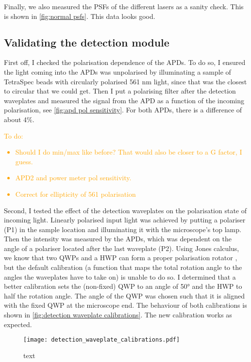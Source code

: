 Finally, we also measured the PSFs of the different lasers as a sanity check. This is shown in \autoref{fig:normal psfs}. This data looks good.  

\subsection{Validating the detection module}

First off, I checked the polarisation dependence of the APDs. To do so, I ensured the light coming into the APDs was unpolarised by illuminating a sample of TetraSpec beads with circularly polarised 561 nm light, since that was the closest to circular that we could get. Then I put a polarising filter after the detection waveplates and measured the signal from the APD as a function of the incoming polarisation, see \autoref{fig:apd pol sensitivity}. For both APDs, there is a difference of about 4\%.

\textcolor{orange}{
To do:
	\begin{itemize}
		\item Should I do min/max like before? That would also be closer to a G factor, I guess.
		\item APD2 and power meter pol sensitivity.
		\item Correct for ellipticity of 561 polarisation
	\end{itemize}
} 

Second, I tested the effect of the detection waveplates on the polarisation state of incoming light. Linearly polarised input light was achieved by putting a polariser (P1) in the sample location and illuminating it with the microscope's top lamp. Then the intensity was measured by the APDs, which was dependent on the angle of a polariser located after the last waveplate (P2). Using Jones calculus, we know that two QWPs and a HWP can form a proper polarisation rotator , but the default calibration (a function that maps the total rotation angle to the angles the waveplates have to take on) is unable to do so. I determined that a better calibration sets the (non-fixed) QWP to an angle of 50° and the HWP to half the rotation angle. The angle of the QWP was chosen such that it is aligned with the fixed QWP at the microscope end. The behaviour of both calibrations is shown in \autoref{fig:detection waveplate calibrations}. The new calibration works as expected.

\begin{figure}
	\centering
	\texttt{[image: detection\_waveplate\_calibrations.pdf]}
	\caption{text}
	\label{fig:detection waveplate calibrations}
\end{figure}

